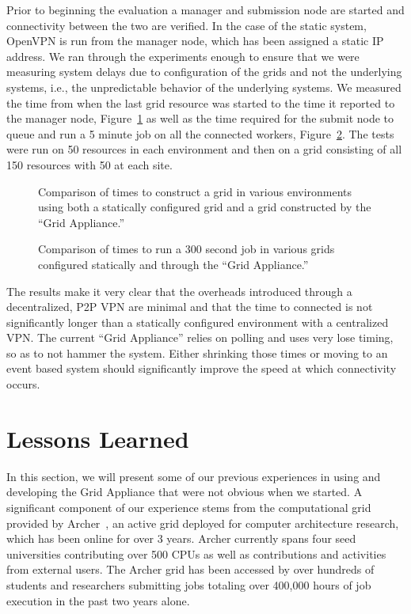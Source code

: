 \documentclass[conference]{IEEEtran}
\begin{document}
Prior to beginning the evaluation a manager and submission node are started and
connectivity between the two are verified.  In the case of the static system,
OpenVPN is run from the manager node, which has been assigned a static IP
address.  We ran through the experiments enough to ensure that we were
measuring system delays due to configuration of the grids and not the
underlying systems, i.e., the unpredictable behavior of the underlying systems.
We measured the time from when the last grid resource was started to the time
it reported to the manager node, Figure~\ref{fig:connect} as well as the time
required for the submit node to queue and run a 5 minute job on all the
connected workers, Figure~\ref{fig:run}.  The tests were run on 50 resources in
each environment and then on a grid consisting of all 150 resources with 50 at
each site.

\begin{figure}[ht]
\centering
{}
\caption{Comparison of times to construct a grid in various environments using
both a statically configured grid and a grid constructed by the ``Grid Appliance.''}
\label{fig:connect}
\end{figure}

\begin{figure}[ht]
\centering
{}
\caption{Comparison of times to run a 300 second job in various grids configured
statically and through the ``Grid Appliance.''}
\label{fig:run}
\end{figure}

The results make it very clear that the overheads introduced through a
decentralized, P2P VPN are minimal and that the time to connected is not
significantly longer than a statically configured environment with a
centralized VPN.  The current ``Grid Appliance'' relies on polling and uses
very lose timing, so as to not hammer the system.  Either shrinking those times
or moving to an event based system should significantly improve the speed at
which connectivity occurs.  

\section{Lessons Learned}
\label{lessons_learned}

In this section, we will present some of our previous experiences in using and
developing the Grid Appliance that were not obvious when we started.  A
significant component of our experience stems from the computational grid
provided by Archer~\cite{archer}, an active grid deployed for computer
architecture research, which has been online for over 3 years.  Archer
currently spans four seed universities contributing over 500 CPUs as well as
contributions and activities from external users.  The Archer grid has been
accessed by over hundreds of students and researchers submitting jobs totaling
over 400,000 hours of job execution in the past two years alone.
\end{document}
